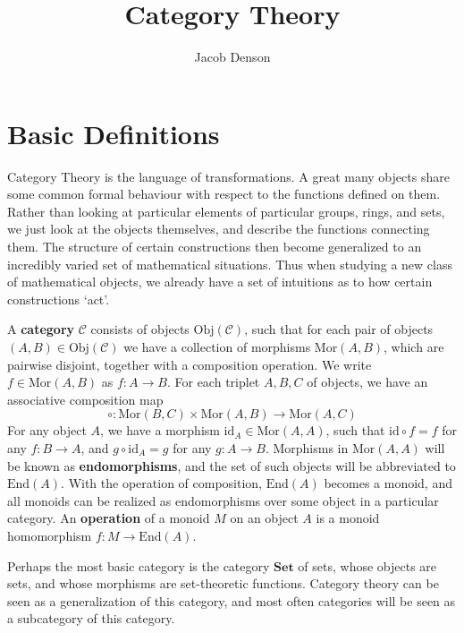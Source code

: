 

\title{Category Theory}
\author{Jacob Denson}



\maketitle
\tableofcontents

\chapter{Basic Definitions}


Category Theory is the language of transformations. A great many objects share some common formal behaviour with respect to the functions defined on them. Rather than looking at particular elements of particular groups, rings, and sets, we just look at the objects themselves, and describe the functions connecting them. The structure of certain constructions then become generalized to an incredibly varied set of mathematical situations. Thus when studying a new class of mathematical objects, we already have a set of intuitions as to how certain constructions `act'.

A {\bf category} $\mathcal{C}$ consists of objects $\text{Obj}(\mathcal{C})$, such that for each pair of objects $(A,B) \in \text{Obj}(\mathcal{C})$ we have a collection of morphisms $\text{Mor}(A,B)$, which are pairwise disjoint, together with a composition operation. We write $f \in \text{Mor}(A,B)$ as $f:A \to B$. For each triplet $A,B,C$ of objects, we have an associative composition map
%
\[ \circ: \text{Mor}(B,C) \times \text{Mor}(A,B) \to \text{Mor}(A,C) \]
%
For any object $A$, we have a morphism $\text{id}_A \in \text{Mor}(A,A)$, such that $\text{id} \circ f = f$ for any $f: B \to A$, and $g \circ \text{id}_A = g$ for any $g: A \to B$. Morphisms in $\text{Mor}(A,A)$ will be known as {\bf endomorphisms}, and the set of such objects will be abbreviated to $\text{End}(A)$. With the operation of composition, $\text{End}(A)$ becomes a monoid, and all monoids can be realized as endomorphisms over some object in a particular category. An {\bf operation} of a monoid $M$ on an object $A$ is a monoid homomorphism $f: M \to \text{End}(A)$.

\begin{example}
    Perhaps the most basic category is the category $\mathbf{Set}$ of sets, whose objects are sets, and whose morphisms are set-theoretic functions. Category theory can be seen as a generalization of this category, and most often categories will be seen as a subcategory of this category.
\end{example}

